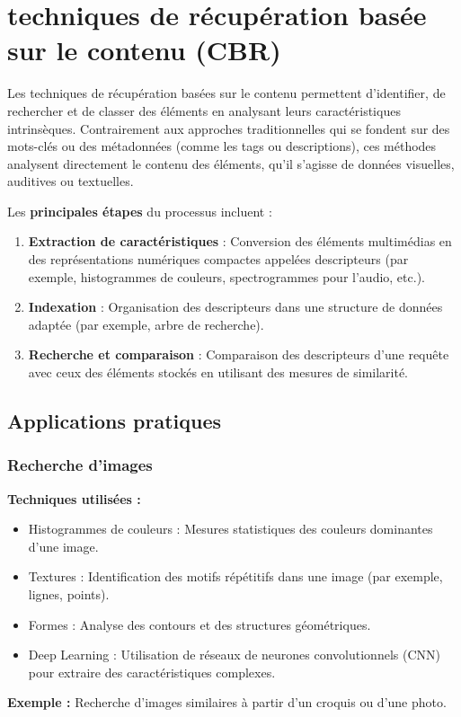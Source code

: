 
\begin{section}

\chapter{techniques de récupération basée sur le contenu (CBR)}
Les techniques de récupération basées sur le contenu permettent d’identifier,
de rechercher et de classer des éléments en analysant leurs caractéristiques
intrinsèques. Contrairement aux approches traditionnelles qui se fondent sur
des mots-clés ou des métadonnées (comme les tags ou descriptions), ces méthodes
analysent directement le contenu des éléments, qu’il s’agisse de données
visuelles, auditives ou textuelles.\par

Les \textbf{principales étapes} du processus incluent :

\begin{enumerate}
    \item \textbf{Extraction de caractéristiques} : Conversion des éléments multimédias en des représentations numériques compactes appelées descripteurs (par exemple, histogrammes de couleurs, spectrogrammes pour l’audio, etc.).
    \item \textbf{Indexation} : Organisation des descripteurs dans une structure de données adaptée (par exemple, arbre de recherche).
    \item \textbf{Recherche et comparaison} : Comparaison des descripteurs d’une requête avec ceux des éléments stockés en utilisant des mesures de similarité.
\end{enumerate}
\setcounter{section}{1}
\section{Applications pratiques}
\subsection{ Recherche d’images}
\textbf{Techniques utilisées :}
\begin{itemize}
    \item Histogrammes de couleurs : Mesures statistiques des couleurs dominantes d’une image.
    \item Textures : Identification des motifs répétitifs dans une image (par exemple, lignes, points).
    \item Formes : Analyse des contours et des structures géométriques.
    \item Deep Learning : Utilisation de réseaux de neurones convolutionnels (CNN) pour extraire des caractéristiques complexes.
\end{itemize}
\textbf{Exemple :} Recherche d’images similaires à partir d’un croquis ou d’une photo.


\end{section}
